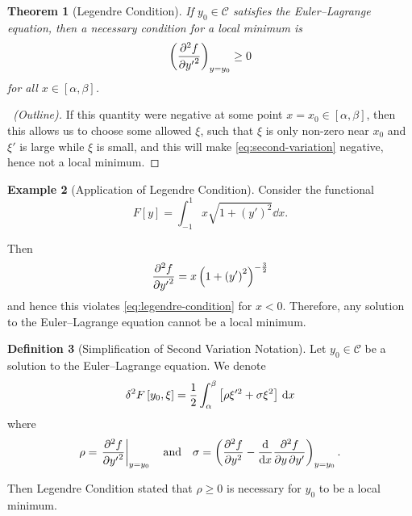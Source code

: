 \documentclass[11pt]{article}
\numberwithin{equation}{section}
\newtheorem{theorem}{Theorem}[section]
\theoremstyle{definition}
\newtheorem{definition}[theorem]{Definition}
\newtheorem{example}[theorem]{Example}
\theoremstyle{remark}
\newcommand{\pqty}[1]{\left(#1\right)}
\newcommand{\bqty}[1]{\left[#1\right]}
\newcommand{\flatfrac}[2]{\frac{#1}{#2}}
\newcommand{\ccintv}[2]{[#1,#2]}
\newcommand{\contClassSymb}{\mathcal{C}}
\newcommand{\rightbar}[1]{\left.#1\right|}
\newcommand{\qand}{\quad\text{and}\quad}
\begin{document}
\begin{theorem}[Legendre Condition]\label{variation-unit-0094}
    \label{thm:legendre-condition}%
    If \(y_0 \in \contClassSymb\) satisfies the Euler--Lagrange equation, then a \emph{necessary} condition for a local minimum is
    \begin{equation}
        \label{eq:legendre-condition}%
        \pqty{\pdv[2]{f}{{y'}}}_{y = y_0} \geq 0
    \end{equation}
    for all \(x \in \ccintv{\alpha}{\beta}\).
\end{theorem}

\begin{proof}[\proofname\ (Outline)]
    If this quantity were negative at some point \(x = x_0 \in \ccintv{\alpha}{\beta}\), then this allows us to choose some allowed \(\xi\), such that \(\xi\) is only non-zero near \(x_0\) and \(\xi'\) is large while \(\xi\) is small, and this will make \autoref{eq:second-variation} negative, hence not a local minimum.
\end{proof}

\begin{example}[Application of Legendre Condition]\label{variation-unit-0095}
    Consider the functional
    \[
        F\bqty{y} = \int_{-1}^{1} x \sqrt{1 + \pqty{y'}^2} \dd{x}.
    \]

    Then
    \[
        \pdv[2]{f}{{y'}} = x \pqty{1 + \pqty{y'}^2}^{-\flatfrac{3}{2}}
    \]
    and hence this violates \autoref{eq:legendre-condition} for \(x < 0\). Therefore, any solution to the Euler--Lagrange equation cannot be a local minimum.
\end{example}

\begin{definition}[Simplification of Second Variation Notation]\label{variation-unit-0096}
    Let \(y_0 \in \contClassSymb\) be a solution to the Euler--Lagrange equation. We denote
    \[
        \var[2]{F\bqty{y_0, \xi}} = \frac{1}{2} \int_{\alpha}^{\beta} \bqty{\rho \xi'^2 + \sigma \xi^2} \dd{x}
    \]
    where
    \begin{equation}
        \label{eq:second-variation-parameter}%
        \rho = \rightbar{\pdv[2]{f}{{y'}}}_{y = y_0} \qand \sigma = \pqty{\pdv[2]{f}{y} - \dv{x} \pdv{f}{y}{y'}}_{y = y_0}.
    \end{equation}
\end{definition}

Then Legendre Condition stated that \(\rho \geq 0\) is necessary for \(y_0\) to be a local minimum.
\end{document}
